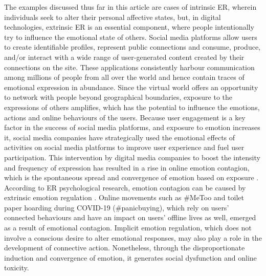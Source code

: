\documentclass[lettersize,journal]{IEEEtran}
\begin{document}
The examples discussed thus far in this article are cases of intrinsic ER, wherein individuals seek to alter their personal affective states, but, in digital technologies, extrinsic ER is an essential component, where people intentionally try to influence the emotional state of others. Social media platforms allow users to create identifiable profiles, represent public connections and consume, produce, and/or interact with a wide range of user-generated content created by their connections on the site. These applications consistently harbour communication among millions of people from all over the world and hence contain traces of emotional expression in abundance. Since the virtual world offers an opportunity to network with people beyond geographical boundaries, exposure to the expressions of others amplifies, which has the potential to influence the emotions, actions and online behaviours of the users. Because user engagement is a key factor in the success of social media platforms, and exposure to emotion increases it, social media companies have strategically used the emotional effects of activities on social media platforms to improve user experience and fuel user participation. This intervention by digital media companies to boost the intensity and frequency of expression has resulted in a rise in online emotion contagion, which is the spontaneous spread and convergence of emotion based on exposure \cite{goldenberg2020digital}. According to ER psychological research, emotion contagion can be caused by extrinsic emotion regulation \cite{elfenbein2014many}. Online movements such as \#MeToo and toilet paper hoarding during COVID-19 (\#panicbuying), which rely on users' connected behaviours and have an impact on users' offline lives as well, emerged as a result of emotional contagion. Implicit emotion regulation, which does not involve a conscious desire to alter emotional responses, may also play a role in the development of connective action. Nonetheless, through the disproportionate induction and convergence of emotion, it generates social dysfunction and online toxicity.
\end{document}
